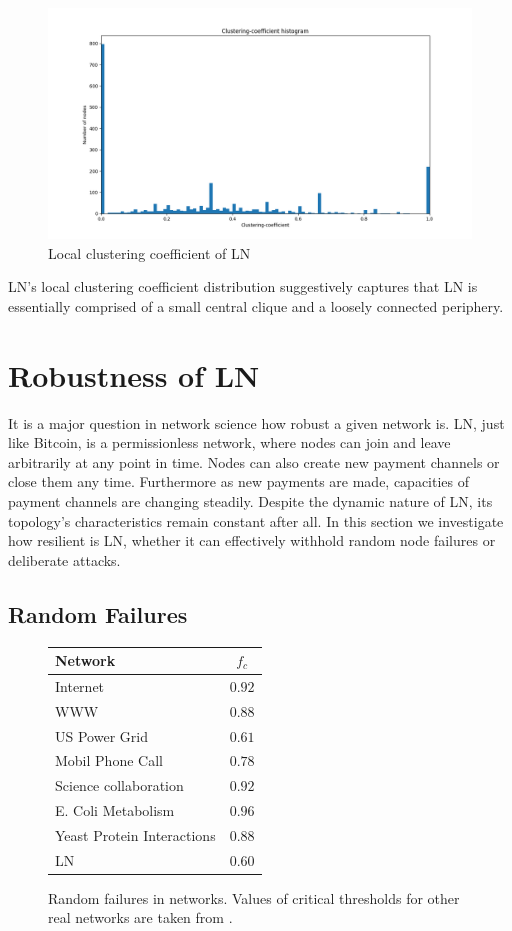\documentclass[a4paper]{article}
\theoremstyle{definition}
\begin{document}
\begin{figure}[h]
	\centering
	\includegraphics[width=\textwidth]{clusteringCoefficient.png}
	\caption{Local clustering coefficient of LN}\label{fig:localclustering}
\end{figure} 

 LN's local clustering coefficient distribution suggestively captures that LN is essentially comprised of a small central clique and a loosely connected periphery.

\section{Robustness of LN}
It is a major question in network science how robust a given network is. LN, just like Bitcoin, is a permissionless network, where nodes can join and leave arbitrarily at any point in time. Nodes can also create new payment channels or close them any time. Furthermore as new payments are made, capacities of payment channels are changing steadily. Despite the dynamic nature of LN, its topology's characteristics remain constant after all.
In this section we investigate how resilient is LN, whether it can effectively withhold random node failures or deliberate attacks.
\subsection{Random Failures}
\begin{figure}
	\begin{tabular}{ | l | c | }
		\hline
		Network & $f_c$  \\ \hline
		Internet & $0.92$  \\ \hline
		WWW & $0.88$ \\ \hline
		US Power Grid & $0.61$  \\ \hline
		Mobil Phone Call & $0.78$ \\ \hline
		Science collaboration& $0.92$ \\ \hline
		E. Coli Metabolism & $0.96$ \\ \hline
		Yeast Protein Interactions & $0.88$ \\ \hline
		LN & $0.60$ \\ \hline
	\end{tabular}
	\caption{Random failures in networks. Values of critical thresholds for other real networks are taken from \cite{barabasi2016network}.}\label{fig:randfailures}
\end{figure}
\end{document}
